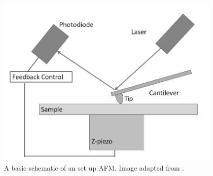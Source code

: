 \begin{figure}[h]     %
        \begin{center}
          \includegraphics[width=110mm]{chapter2/RAFMSch.png}
\end{center}
\caption{A basic schematic of an set up AFM. Image adapted from \cite{RAFMSchRef}.}
\label{fig:AFMSch}                 %
\end{figure}


